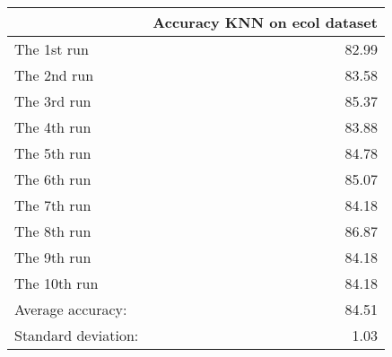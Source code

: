 \begin{tabular}{lr}
\toprule
{} &  Accuracy KNN on ecol dataset \\
\midrule
The 1st run         &                         82.99 \\
The 2nd run         &                         83.58 \\
The 3rd run         &                         85.37 \\
The 4th run         &                         83.88 \\
The 5th run         &                         84.78 \\
The 6th run         &                         85.07 \\
The 7th run         &                         84.18 \\
The 8th run         &                         86.87 \\
The 9th run         &                         84.18 \\
The 10th run        &                         84.18 \\
Average accuracy:   &                         84.51 \\
Standard deviation: &                          1.03 \\
\bottomrule
\end{tabular}
